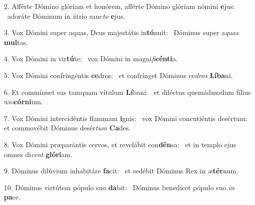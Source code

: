 2. Afférte Dómino glóriam et honórem, afférte Dómino glóriam nómini \textbf{e}jus: \ast\  adoráte Dóminum in átrio sanc\textit{to} \textbf{e}jus.\

3. Vox Dómini super aquas, Deus majestátis in\textbf{tó}nuit: \ast\  Dóminus super a\textit{quas} \textbf{mul}tas.\

4. Vox Dómini in vir\textbf{tú}te: \ast\  vox Dómini in magni\textit{fi}\textbf{cén}\textbf{ti}a.\

5. Vox Dómini confringéntis \textbf{ce}dros: \ast\  et confrínget Dóminus ce\textit{dros} \textbf{Lí}\textbf{ba}ni.\

6. Et commínuet eas tamquam vítulum \textbf{Lí}bani: \ast\  et diléctus quemádmodum fílius u\textit{ni}\textbf{cór}\textbf{ni}um.\

7. Vox Dómini intercidéntis flammam \textbf{i}gnis: \ast\  vox Dómini concutiéntis desértum: et commovébit Dóminus desér\textit{tum} \textbf{Ca}des.\

8. Vox Dómini præparántis cervos, et revelábit con\textbf{dén}sa: \ast\  et in templo ejus omnes di\textit{cent} \textbf{gló}\textbf{ri}am.\

9. Dóminus dilúvium inhabitáre \textbf{fa}cit: \ast\  et sedébit Dóminus Rex in \textit{æ}\textbf{tér}num.\

10. Dóminus virtútem pópulo suo \textbf{da}bit: \ast\  Dóminus benedícet pópulo suo \textit{in} \textbf{pa}ce.\

